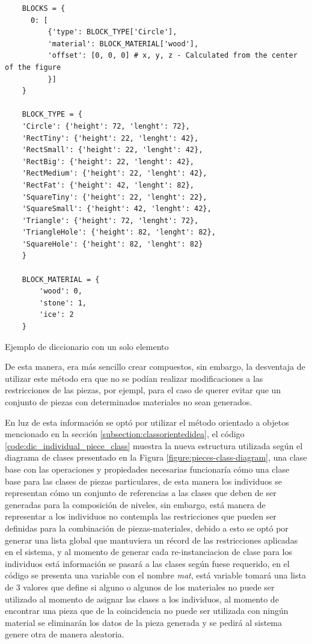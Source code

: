 \begin{listing}[t]
  \begin{verbatim}
    BLOCKS = {
      0: [
          {'type': BLOCK_TYPE['Circle'],
          'material': BLOCK_MATERIAL['wood'],
          'offset': [0, 0, 0] # x, y, z - Calculated from the center of the figure
          }]
    }

    BLOCK_TYPE = {
    'Circle': {'height': 72, 'lenght': 72},
    'RectTiny': {'height': 22, 'lenght': 42},
    'RectSmall': {'height': 22, 'lenght': 42},
    'RectBig': {'height': 22, 'lenght': 42},
    'RectMedium': {'height': 22, 'lenght': 42},
    'RectFat': {'height': 42, 'lenght': 82},
    'SquareTiny': {'height': 22, 'lenght': 22},
    'SquareSmall': {'height': 42, 'lenght': 42},
    'Triangle': {'height': 72, 'lenght': 72},
    'TriangleHole': {'height': 82, 'lenght': 82},
    'SquareHole': {'height': 82, 'lenght': 82}
    }

    BLOCK_MATERIAL = {
        'wood': 0,
        'stone': 1,
        'ice': 2
    }
  \end{verbatim}
  \caption{Ejemplo de diccionario con un solo elemento}
  \label{code:dic_individual_piece}
\end{listing}

De esta manera, era más sencillo crear compuestos,
sin embargo, la desventaja de utilizar este método era que no se podían
realizar modificaciones a las restricciones de las piezas, por ejempl, para el caso de
querer evitar que un conjunto de piezas con determinados materiales no sean
generados.

En luz de esta información se optó por utilizar el método orientado a objetos
mencionado en la sección \ref{subsection:classorientedidea}, el código
\ref{code:dic_individual_piece_class} muestra la nueva estructura utilizada según el
diagrama de clases presentado en la Figura \ref{figure:pieces-class-diagram},
una clase base con las operaciones y
propiedades necesarias funcionaría cómo una clase base para las clases
de piezas particulares, de esta manera los individuos se representan cómo un
conjunto de referencias a las clases que deben de ser generadas para la
composición de niveles, sin embargo, está manera de representar a los individuos
no contempla las restricciones que pueden ser definidas para la combinación de
piezas-materiales, debido a esto se optó por generar una lista global que
mantuviera un récord de las restricciones aplicadas en el sistema, y al momento
de generar cada re-instanciacion de clase para los individuos está información se
pasará a las clases según fuese requerido, en el código se presenta una variable
con el nombre \textit{mat}, está variable tomará una lista de 3 valores que
define si alguno o algunos de los materiales no puede ser utilizado al momento
de asignar las clases a los individuos, al momento de encontrar una pieza que de
la coincidencia no puede ser utilizada con ningún material se eliminarán los
datos de la pieza generada y se pedirá al sistema genere otra de manera aleatoria.

